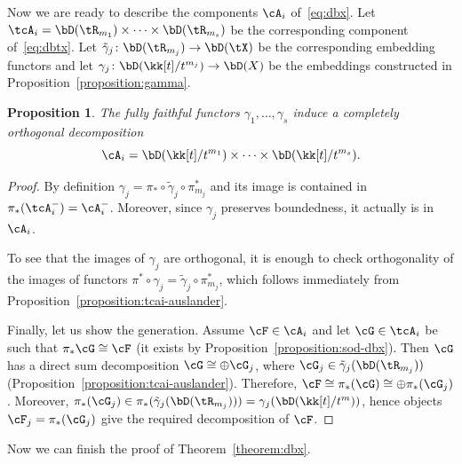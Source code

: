 \documentclass[11pt]{amsart}
\theoremstyle{plain}
\newtheorem{proposition}[theorem]{Proposition}
\theoremstyle{definition}
\theoremstyle{remark}
\begin{document}
Now we are ready to describe the components $\cA_i$ of~\eqref{eq:dbx}.
Let $\tcA_i = \bD(\tR_{m_1}) \times \dots \times \bD(\tR_{m_s})$ be the corresponding component of~\eqref{eq:dbtx}.
Let $\tilde\gamma_j \colon \bD(\tR_{m_j}) \to \bD(\tX)$ be the corresponding embedding functors and 
let $\gamma_j \colon \bD(\kk[t]/t^{m_j}) \to \bD(X)$ be the embeddings constructed in Proposition~\ref{proposition:gamma}.

\begin{proposition}
\label{proposition:sod-cai}
The fully faithful functors $\gamma_1,\dots,\gamma_s$ induce a completely orthogonal decomposition 
\begin{equation*}
\cA_i = \bD(\kk[t]/t^{m_1}) \times \dots \times \bD(\kk[t]/t^{m_s}).
\end{equation*}
\end{proposition}
\begin{proof}
By definition $\gamma_j = \pi_* \circ \tilde\gamma_j \circ \pi_{m_j}^*$ and its image is contained in $\pi_*(\tcA_i^-) = \cA_i^-$.
Moreover, since $\gamma_j$ preserves boundedness, it actually is in $\cA_i$.

To see that the images of $\gamma_j$ are orthogonal, it is enough to check orthogonality of the images of functors $\pi^* \circ \gamma_j = \tilde\gamma_j \circ \pi_{m_j}^*$,
which follows immediately from Proposition~\ref{proposition:tcai-auslander}.


Finally, let us show the generation.
Assume $\cF \in \cA_i$ and let $\cG \in \tcA_i$ be such that $\pi_*\cG \cong \cF$ (it exists by Proposition~\ref{proposition:sod-dbx}). 
Then $\cG$ has a direct sum decomposition $\cG \cong \oplus \cG_j$, 
where $\cG_j \in \tilde\gamma_j(\bD(\tR_{m_j}))$ (Proposition~\ref{proposition:tcai-auslander}).
Therefore, $\cF \cong \pi_*(\cG) \cong \oplus \pi_*(\cG_j)$.
Moreover, $\pi_*(\cG_j) \in \pi_*(\tilde\gamma_j(\bD(\tR_{m_j}))) = \gamma_j(\bD(\kk[t]/t^m))$,
hence objects $\cF_j = \pi_*(\cG_j)$ give the required decomposition of $\cF$.
\end{proof}



Now we can finish the proof of Theorem~\ref{theorem:dbx}.
\end{document}
